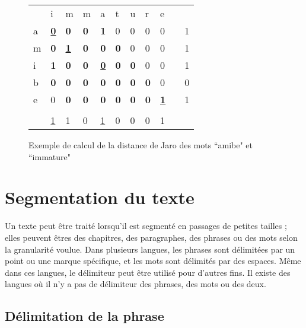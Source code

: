 \documentclass{KodeBook}
\begin{document}
\begin{figure}[ht]
\begin{minipage}{0.45\textwidth}
\begin{tabular}{|l|l|l|l|l|l|l|l|l|l|l|}
	\cline{1-9}
	  & i & m & m & a & t & u & r & e & \multicolumn{2}{l}{ }\\
	\cline{1-9}\cline{11-11}
	a & \underline{\textbf{0}} & \textbf{0} & \textbf{0} & \textbf{1} & 0 & 0 & 0 & 0 & & 1\\
	\cline{1-9}\cline{11-11}
	m & \textbf{0} & \underline{\textbf{1}} & \textbf{0} & \textbf{0} & \textbf{0} & 0 & 0 & 0 & & 1\\
	\cline{1-9}\cline{11-11}
	i & \textbf{1} & \textbf{0} & \textbf{0} & \underline{\textbf{0}} & \textbf{0} & \textbf{0} & 0 & 0 & & 1\\
	\cline{1-9}\cline{11-11}
	b & \textbf{0} & \textbf{0} & \textbf{0} & \textbf{0} & \textbf{0} & \textbf{0} & \textbf{0} & 0 & & 0\\
	\cline{1-9}\cline{11-11}
	e & 0 & \textbf{0} & \textbf{0} & \textbf{0} & \textbf{0} & \textbf{0} & \textbf{0} & \underline{\textbf{1}} & & 1\\
	\cline{1-9}\cline{11-11}
	\multicolumn{11}{l}{ }\\
	\cline{2-9}
	\multicolumn{1}{l|}{} & \underline{1} & 1 & 0 & \underline{1} & 0 & 0 & 0 & 1 & \multicolumn{2}{l}{ }\\
	\cline{2-9}
\end{tabular}
\end{minipage}
\caption[Exemple de calcul de la distance de Jaro]{Exemple de calcul de la distance de Jaro des mots ``amibe"  et ``immature" \label{fig:jaro}}
\end{figure}
\section{Segmentation du texte}

Un texte peut être traité lorsqu'il est segmenté en passages de petites tailles ; elles peuvent êtres des chapitres, des paragraphes, des phrases ou des mots selon la granularité voulue.
Dans plusieurs langues, les phrases sont délimitées par un point ou une marque spécifique, et les mots sont délimités par des espaces. 
Même dans ces langues, le délimiteur peut être utilisé pour d'autres fins. 
Il existe des langues où il n'y a pas de délimiteur des phrases, des mots ou des deux.

\subsection{Délimitation de la phrase}
\end{document}
